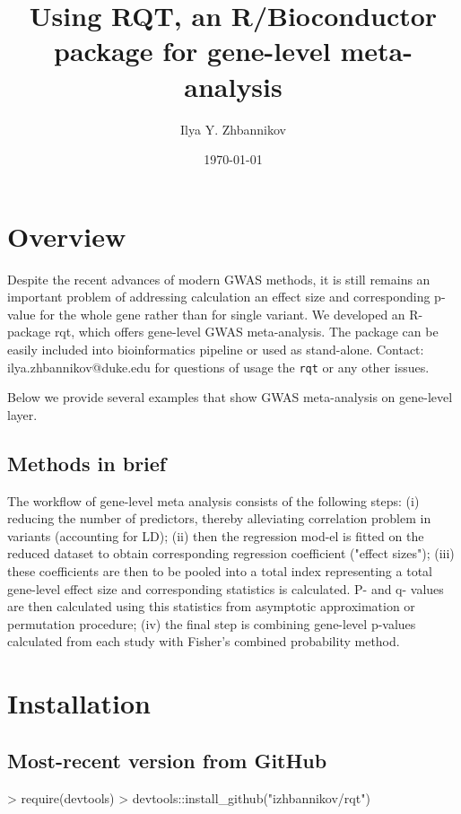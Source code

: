 \documentclass{article}
\title{Using RQT, an R/Bioconductor package for gene-level meta-analysis}
\author{Ilya Y. Zhbannikov}
\date{\today}
\begin{document}

\maketitle

\section{Overview}

Despite the recent advances of modern GWAS methods, 
it is still remains an important problem of addressing 
calculation an effect size and corresponding p-value 
for the whole gene rather than for single variant. 
We developed an R-package rqt, which offers gene-level GWAS meta-analysis. 
The package can be easily included into bioinformatics pipeline 
or used as stand-alone. 
Contact: ilya.zhbannikov@duke.edu for questions of 
usage the \texttt{rqt} or any other issues.

Below we provide several examples that show GWAS 
meta-analysis on gene-level layer.

\subsection{Methods in brief}

The workflow of gene-level meta analysis consists of the following steps: 
(i) reducing the number of predictors, thereby alleviating 
correlation problem in variants (accounting for LD); 
(ii) then the regression mod-el is fitted on the reduced dataset 
to obtain corresponding regression coefficient ("effect sizes"); 
(iii) these coefficients are then to be pooled into a total index 
representing a total gene-level effect size and corresponding 
statistics is calculated. P- and q- values are then calculated 
using this statistics from asymptotic approximation or permutation 
procedure; (iv) the final step is combining gene-level p-values 
calculated from each study with Fisher's combined probability method.

\section{Installation}

\subsection{Most-recent version from GitHub}

\begin{Schunk}
\begin{Sinput}
> require(devtools)
> devtools::install_github("izhbannikov/rqt")
\end{Sinput}
\end{Schunk}
\end{document}
